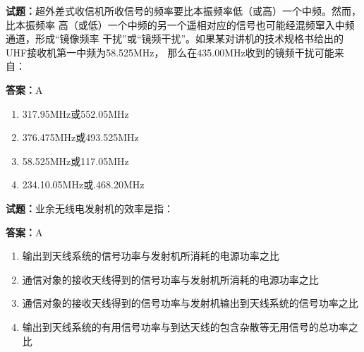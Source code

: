 \documentclass{ctexbook}
\begin{document}



\vspace{1em}

\textbf{试题：}超外差式收信机所收信号的频率要比本振频率低（或高）一个中频。然而，比本振频率
高（或低）一个中频的另一个遥相对应的信号也可能经混频窜入中频通道，形成“镜像频率
干扰”或“镜频干扰”。如果某对讲机的技术规格书给出的UHF接收机第一中频为58.525MHz，
那么在435.00MHz收到的镜频干扰可能来自： 

\textbf{答案：}A 

\begin{enumerate}[leftmargin=3em]
  \item 317.95MHz或552.05MHz 

  \item 376.475MHz或493.525MHz 

  \item 58.525MHz或117.05MHz 

  \item 234.10.05MHz或.468.20MHz 

\end{enumerate}





\vspace{1em}

\textbf{试题：}业余无线电发射机的效率是指： 

\textbf{答案：}A 

\begin{enumerate}[leftmargin=3em]
  \item 输出到天线系统的信号功率与发射机所消耗的电源功率之比 

  \item 通信对象的接收天线得到的信号功率与发射机所消耗的电源功率之比 

  \item 通信对象的接收天线得到的信号功率与发射机输出到天线系统的信号功率之比 


  \item 输出到天线系统的有用信号功率与到达天线的包含杂散等无用信号的总功率之比 

\end{enumerate}





\vspace{1em}
\end{document}
